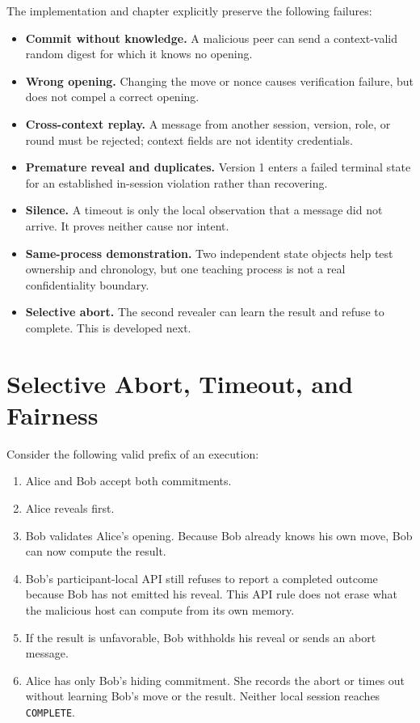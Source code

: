 The implementation and chapter explicitly preserve the following failures:

\begin{itemize}
    \item \textbf{Commit without knowledge.} A malicious peer can send a
    context-valid random digest for which it knows no opening.
    \item \textbf{Wrong opening.} Changing the move or nonce causes
    verification failure, but does not compel a correct opening.
    \item \textbf{Cross-context replay.} A message from another session,
    version, role, or round must be rejected; context fields are not identity
    credentials.
    \item \textbf{Premature reveal and duplicates.} Version 1 enters a failed
    terminal state for an established in-session violation rather than
    recovering.
    \item \textbf{Silence.} A timeout is only the local observation that a
    message did not arrive. It proves neither cause nor intent.
    \item \textbf{Same-process demonstration.} Two independent state objects
    help test ownership and chronology, but one teaching process is not a real
    confidentiality boundary.
    \item \textbf{Selective abort.} The second revealer can learn the result
    and refuse to complete. This is developed next.
\end{itemize}

\section{Selective Abort, Timeout, and Fairness}

Consider the following valid prefix of an execution:

\begin{enumerate}
    \item Alice and Bob accept both commitments.
    \item Alice reveals first.
    \item Bob validates Alice's opening. Because Bob already knows his own
    move, Bob can now compute the result.
    \item Bob's participant-local API still refuses to report a completed
    outcome because Bob has not emitted his reveal. This API rule does not
    erase what the malicious host can compute from its own memory.
    \item If the result is unfavorable, Bob withholds his reveal or sends an
    abort message.
    \item Alice has only Bob's hiding commitment. She records the abort or
    times out without learning Bob's move or the result. Neither local session
    reaches \texttt{COMPLETE}.
\end{enumerate}


